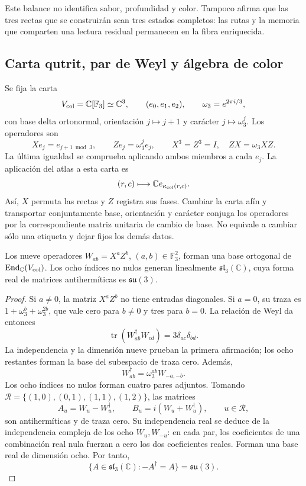 Este balance no identifica sabor, profundidad y color. Tampoco afirma
que las tres rectas que se construirán sean tres estados completos:
las rutas y la memoria que comparten una lectura residual permanecen
en la fibra enriquecida.

\subsection{Carta qutrit, par de Weyl y álgebra de color}
\label{hmtcuatro:color:weyl}

Se fija la carta
\[
 V_{\rm col}=\mathbb C[\mathbb F_3]\simeq\mathbb C^3,
 \qquad (e_0,e_1,e_2),\qquad
 \omega_3=e^{2\pi i/3},
\]
con base delta ortonormal, orientación \(j\mapsto j+1\) y carácter
\(j\mapsto\omega_3^j\). Los operadores son
\[
 Xe_j=e_{j+1\bmod3},\qquad Ze_j=\omega_3^j e_j,
 \qquad X^3=Z^3=I,\quad ZX=\omega_3XZ.
\]
La última igualdad se comprueba aplicando ambos miembros a cada
\(e_j\). La aplicación del atlas a esta carta es
\[
 (r,c)\longmapsto\mathbb C e_{\kappa_{\rm col}(r,c)}.
\]
Así, \(X\) permuta las rectas y \(Z\) registra sus fases. Cambiar
la carta afín y transportar conjuntamente base, orientación y carácter
conjuga los operadores por la correspondiente matriz unitaria de
cambio de base. No equivale a cambiar sólo una etiqueta y dejar fijos
los demás datos.

\begin{theorem}
\label{hmtcuatro:color:algebra}
Los nueve operadores \(W_{ab}=X^aZ^b\),
\((a,b)\in\mathbb F_3^2\), forman una base ortogonal de
\(\operatorname{End}_{\mathbb C}(V_{\rm col})\). Los ocho índices
no nulos generan linealmente \(\mathfrak{sl}_3(\mathbb C)\), cuya
forma real de matrices antihermíticas es \(\mathfrak{su}(3)\).
\end{theorem}
\begin{proof}
Si \(a\ne0\), la matriz \(X^aZ^b\) no tiene entradas diagonales.
Si \(a=0\), su traza es \(1+\omega_3^b+\omega_3^{2b}\), que
vale cero para \(b\ne0\) y tres para \(b=0\). La relación de
Weyl da entonces
\[
 \operatorname{tr}(W_{ab}^{\dagger}W_{cd})
 =3\delta_{ac}\delta_{bd}.
\]
La independencia y la dimensión nueve prueban la primera afirmación;
los ocho restantes forman la base del subespacio de traza cero.
Además,
\[
 W_{ab}^{\dagger}=\omega_3^{ab}W_{-a,-b}.
\]
Los ocho índices no nulos forman cuatro pares adjuntos. Tomando
\(\mathcal R=\{(1,0),(0,1),(1,1),(1,2)\}\), las matrices
\[
 A_u=W_u-W_u^{\dagger},\qquad
 B_u=i(W_u+W_u^{\dagger}),\qquad u\in\mathcal R,
\]
son antihermíticas y de traza cero. Su independencia real se deduce
de la independencia compleja de los ocho \(W_u,W_{-u}\): en cada
par, los coeficientes de una combinación real nula fuerzan a cero
los dos coeficientes reales. Forman una base real de dimensión ocho.
Por tanto,
\[
 \{A\in\mathfrak{sl}_3(\mathbb C):-A^{\dagger}=A\}
 =\mathfrak{su}(3).
\]
\end{proof}


